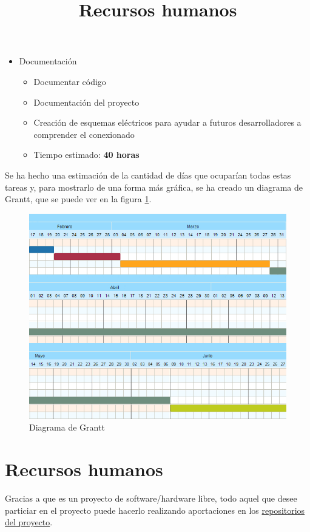 \begin{itemize}
  \item Documentación
  \begin{itemize}
    \item{Documentar código}
    \item{Documentación del proyecto}
    \item{Creación de esquemas eléctricos para ayudar a futuros desarrolladores
    a comprender el conexionado}
    \item{Tiempo estimado: \textbf{40 horas}}
  \end{itemize}
\end{itemize}

Se ha hecho una estimación de la cantidad de días que ocuparían todas
estas tareas y, para mostrarlo de una forma más gráfica,
se ha creado un diagrama de Grantt, que se puede ver en la figura \ref{fig:grantt}.

\begin{figure}[htb]
\centering
\includegraphics[width=1\textwidth]{./imagenes/grantt}
\caption{Diagrama de Grantt} \label{fig:grantt}
\end{figure}


\title{Recursos humanos}
\section{Recursos humanos}

Gracias a que es un proyecto de software/hardware libre, todo aquel que
desee particiar en el proyecto puede hacerlo realizando aportaciones en los
\href{https://github.com/iblancasa/ArduBand}{repositorios del proyecto}.


